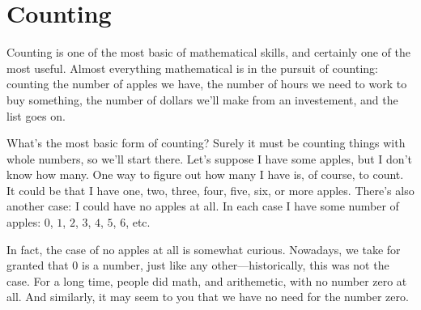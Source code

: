\section{Counting}

Counting is one of the most basic of mathematical skills, and certainly one of the most useful.
Almost everything mathematical is in the pursuit of counting: counting the number of apples we have, the number of hours we need to work to buy something, the number of dollars we'll make from an investement, and the list goes on.

What's the most basic form of counting?
Surely it must be counting things with whole numbers, so we'll start there.
Let's suppose I have some apples, but I don't know how many.
One way to figure out how many I have is, of course, to count.
It could be that I have one, two, three, four, five, six, or more apples.
There's also another case: I could have no apples at all.
In each case I have some number of apples: $0$, $1$, $2$, $3$, $4$, $5$, $6$, etc.

In fact, the case of no apples at all is somewhat curious.
Nowadays, we take for granted that $0$ is a number, just like any other---historically, this was not the case.
For a long time, people did math, and arithemetic, with no number zero at all.
And similarly, it may seem to you that we have no need for the number zero.

